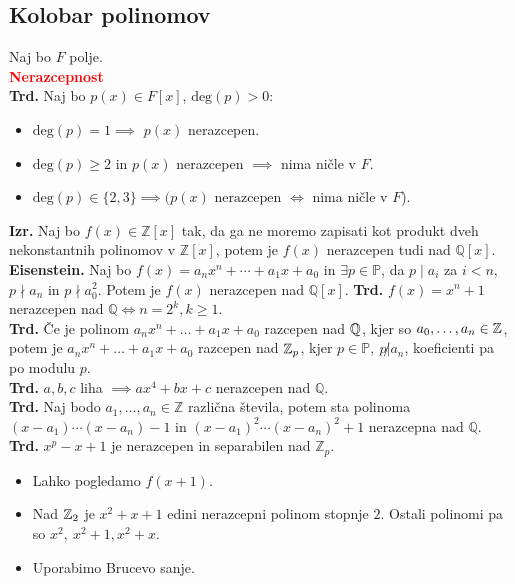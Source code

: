 \documentclass[a4paper,oneside,8pt,landscape]{extarticle}
\begin{document}
\begin{multicols*}{3}
\section{Kolobar polinomov}
Naj bo $F$ polje.\\
%
%
\textbf{\textcolor{red}{Nerazcepnost}}\\
\textbf{Trd.} Naj bo $p(x)\in F[x]$, $\text{deg}(p)>0$:
\begin{itemize}
    \item $\text{deg}(p)=1\implies$ $p(x)$ nerazcepen.
    \item $\text{deg}(p)\geq2$ in $p(x)$ nerazcepen $\implies$ nima ničle v $F$.
    \item $\text{deg}(p)\in\{2,3\}\implies (p(x)\text{ nerazcepen } \iff $ nima ničle v $F$).
\end{itemize}
\textbf{Izr.} Naj bo $f(x)\in \mathbb{Z}[x]$ tak, da ga ne moremo zapisati kot produkt dveh nekonstantnih polinomov v $\mathbb{Z}[x]$, potem je $f(x)$ nerazcepen tudi nad $\mathbb{Q}[x]$.\\
\textbf{Eisenstein.} Naj bo $f(x) = a_nx^n+\cdots + a_1 x + a_0$ in $\exists p\in\mathbb{P}$, da $p\mid a_i$ za $i<n$, $p\nmid a_n$ in $p \nmid a_0^2$. Potem je $f(x)$ nerazcepen nad $\mathbb{Q}[x]$.
\textbf{Trd.} $f(x) = x^n+1$ nerazcepen nad $\mathbb{Q} \iff n = 2^k, k\geq 1$.\\
\textbf{Trd.} Če je polinom \(a_nx^n + \ldots + a_1x + a_0\) razcepen nad \(\mathbb{Q}\), kjer so \(a_0, \ldots, a_n \in \mathbb{Z}\), potem je \(a_nx^n + \ldots + a_1x + a_0\) razcepen nad \(\mathbb{Z}_p\), kjer \(p \in \mathbb{P},\ p \not | a_n\), koeficienti pa po modulu \(p\).\\
\textbf{Trd.} $a,b,c$ liha $\implies ax^4 + bx + c$ nerazcepen nad $\mathbb{Q}$.\\
\textbf{Trd.} Naj bodo $a_1,\dots, a_n\in \mathbb{Z}$ različna števila, potem sta polinoma $(x-a_1)\cdots (x-a_n)-1$ in $(x-a_1)^2\cdots (x-a_n)^2+1$ nerazcepna nad $\mathbb{Q}$.\\
\textbf{Trd.} $x^p-x+1$ je nerazcepen in separabilen nad $\mathbb{Z}_p$.
\begin{itemize}
    \item Lahko pogledamo \(f(x+1)\).
    \item Nad \(\mathbb{Z}_2\) je \(x^2+x+1\) edini nerazcepni polinom stopnje \(2\). Ostali polinomi pa so \(x^2,\ x^2+1, x^2+x\).
    \item Uporabimo Brucevo sanje.
\end{itemize}
%

\end{multicols*}
\end{document}
